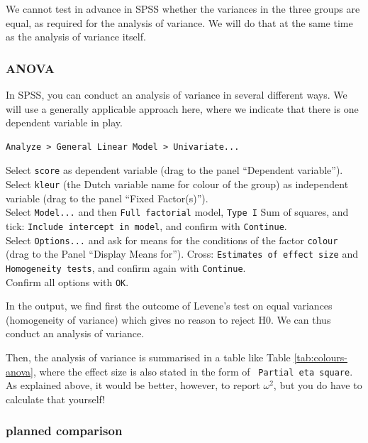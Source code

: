 \documentclass[
]{book}
\begin{document}
We cannot test in advance in SPSS whether the variances in the three groups
are equal, as required for the analysis of variance. We will do that at the same
time as the analysis of variance itself.

\hypertarget{anova}{%
\subsubsection{ANOVA}\label{anova}}

In SPSS, you can conduct an analysis of variance in several
different ways. We
will use a generally applicable approach here, where we indicate that there
is one dependent variable in play.\\

\begin{verbatim}
Analyze > General Linear Model > Univariate...
\end{verbatim}

Select \texttt{score} as dependent variable (drag to the panel
``Dependent variable'').\\
Select \texttt{kleur} (the Dutch variable name for colour of the group) as independent variable (drag to the panel ``Fixed
Factor(s)'').\\
Select \texttt{Model...} and then \texttt{Full\ factorial} model, \texttt{Type\ I} Sum
of squares, and tick: \texttt{Include\ intercept\ in\ model}, and confirm with
\texttt{Continue}.\\
Select \texttt{Options...} and ask for means for the conditions
of the factor \texttt{colour} (drag to the Panel ``Display Means for''). Cross:
\texttt{Estimates\ of\ effect\ size} and \texttt{Homogeneity\ tests}, and confirm again with
\texttt{Continue}.\\
Confirm all options with \texttt{OK}.

In the output, we find first the outcome of Levene's test on equal
variances (homogeneity of variance) which gives no reason to reject
H0. We can thus conduct an analysis of variance.

Then, the analysis of variance is summarised in a table like Table
\ref{tab:colours-anova}, where the effect size is also stated in
the form of \texttt{~Partial\ eta\ square}.
As explained above, it would be better, however, to report
\(\omega^2\), but you do have to calculate that yourself!

\hypertarget{planned-comparison}{%
\subsubsection{planned comparison}\label{planned-comparison}}
\end{document}
